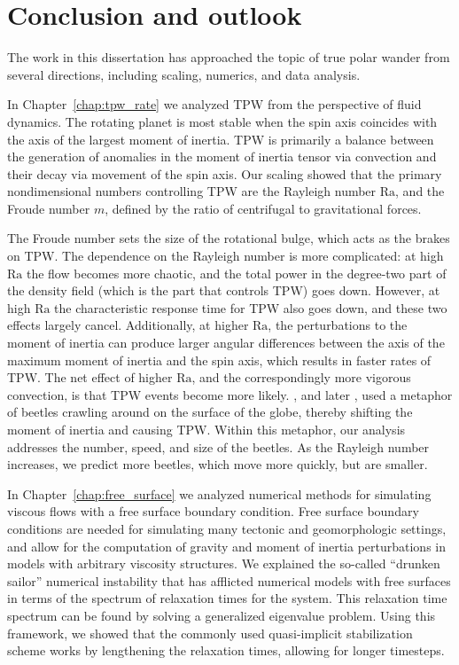 \chapter{Conclusion and outlook}
\label{chap:conclusion}

The work in this dissertation has approached the topic of true polar wander
from several directions, including scaling, numerics, and data analysis.

In Chapter~\ref{chap:tpw_rate} we analyzed TPW from the perspective of fluid dynamics.
The rotating planet is most stable when the spin axis coincides with the axis of the largest moment of inertia.
TPW is primarily a balance between the generation of anomalies in the moment of inertia tensor
via convection and their decay via movement of the spin axis.
Our scaling showed that the primary nondimensional numbers controlling TPW are the Rayleigh number $\mathrm{Ra}$,
and the Froude number $m$, defined by the ratio of centrifugal to gravitational forces.

The Froude number sets the size of the rotational bulge, which acts
as the brakes on TPW. The dependence on the Rayleigh number is more complicated:
at high $\mathrm{Ra}$ the flow becomes more chaotic, and the total power in the degree-two
part of the density field (which is the part that controls TPW) goes down.
However, at high $\mathrm{Ra}$ the characteristic response time for TPW also goes down,
and these two effects largely cancel. Additionally, at higher $\mathrm{Ra}$,
the perturbations to the moment of inertia can produce larger angular differences
between the axis of the maximum moment of inertia and the spin axis,
which results in faster rates of TPW. The net effect of higher $\mathrm{Ra}$,
and the correspondingly more vigorous convection, is that TPW events become more likely.
\citet{gold1955instability}, and later \citet{goldreich1969some}, used a metaphor
of beetles crawling around on the surface of the globe, thereby shifting the moment
of inertia and causing TPW. Within this metaphor, our analysis addresses the
number, speed, and size of the beetles. As the Rayleigh number increases,
we predict more beetles, which move more quickly, but are smaller.

In Chapter~\ref{chap:free_surface} we analyzed numerical methods for simulating
viscous flows with a free surface boundary condition. Free surface boundary conditions
are needed for simulating many tectonic and geomorphologic settings, and
allow for the computation of gravity and moment of inertia perturbations 
in models with arbitrary viscosity structures. 
We explained the so-called ``drunken sailor'' numerical instability that
has afflicted numerical models with free surfaces in terms of the spectrum of relaxation
times for the system. This relaxation time spectrum can be found by solving a generalized eigenvalue problem.
Using this framework, we showed that the commonly used quasi-implicit stabilization
scheme works by lengthening the relaxation times, allowing for longer timesteps.

